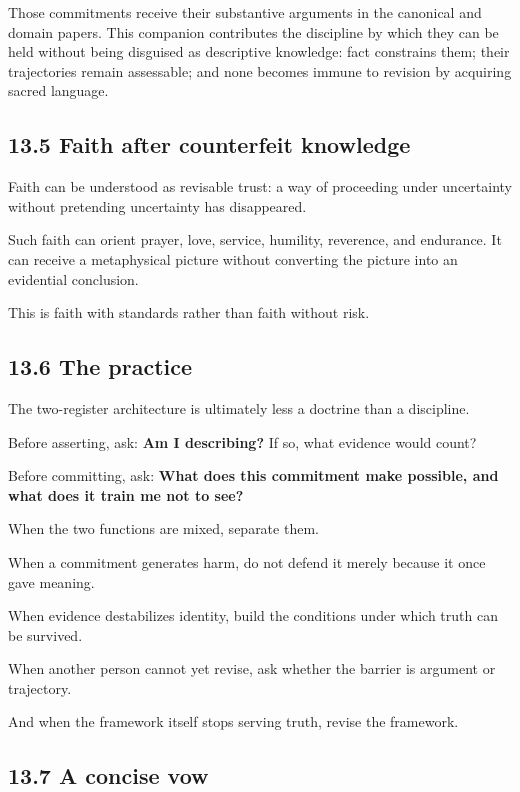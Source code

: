 \documentclass[
  11pt,
]{article}
\begin{document}
Those commitments receive their substantive arguments in the canonical
and domain papers. This companion contributes the discipline by which
they can be held without being disguised as descriptive knowledge: fact
constrains them; their trajectories remain assessable; and none becomes
immune to revision by acquiring sacred language.

\subsection{13.5 Faith after counterfeit
knowledge}\label{faith-after-counterfeit-knowledge}

Faith can be understood as revisable trust: a way of proceeding under
uncertainty without pretending uncertainty has disappeared.

Such faith can orient prayer, love, service, humility, reverence, and
endurance. It can receive a metaphysical picture without converting the
picture into an evidential conclusion.

This is faith with standards rather than faith without risk.

\subsection{13.6 The practice}\label{the-practice}

The two-register architecture is ultimately less a doctrine than a
discipline.

Before asserting, ask: \textbf{Am I describing?} If so, what evidence
would count?

Before committing, ask: \textbf{What does this commitment make possible,
and what does it train me not to see?}

When the two functions are mixed, separate them.

When a commitment generates harm, do not defend it merely because it
once gave meaning.

When evidence destabilizes identity, build the conditions under which
truth can be survived.

When another person cannot yet revise, ask whether the barrier is
argument or trajectory.

And when the framework itself stops serving truth, revise the framework.

\subsection{13.7 A concise vow}\label{a-concise-vow}
\end{document}
